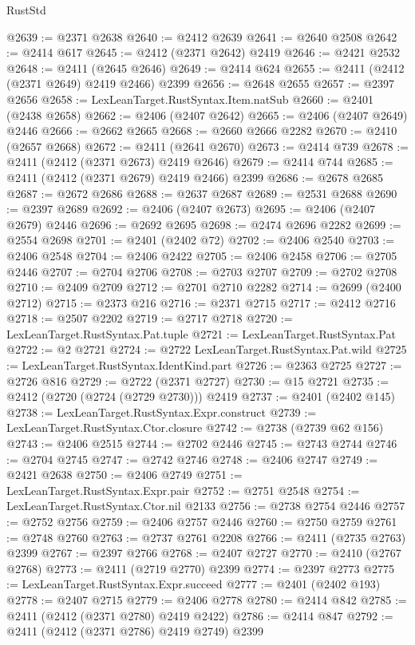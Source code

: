 \begin{lexlean}{RustStd}
\begin{coremodule}
@2639 := @2371 @2638
@2640 := @2412 @2639
@2641 := @2640 @2508
@2642 := @2414 @617
@2645 := @2412 (@2371 @2642) @2419
@2646 := @2421 @2532
@2648 := @2411 (@2645 @2646)
@2649 := @2414 @624
@2655 := @2411 (@2412 (@2371 @2649) @2419 @2466) @2399
@2656 := @2648 @2655
@2657 := @2397 @2656
@2658 := LexLeanTarget.RustSyntax.Item.natSub
@2660 := @2401 (@2438 @2658)
@2662 := @2406 (@2407 @2642)
@2665 := @2406 (@2407 @2649) @2446
@2666 := @2662 @2665
@2668 := @2660 @2666 @2282
@2670 := @2410 (@2657 @2668)
@2672 := @2411 (@2641 @2670)
@2673 := @2414 @739
@2678 := @2411 (@2412 (@2371 @2673) @2419 @2646)
@2679 := @2414 @744
@2685 := @2411 (@2412 (@2371 @2679) @2419 @2466) @2399
@2686 := @2678 @2685
@2687 := @2672 @2686
@2688 := @2637 @2687
@2689 := @2531 @2688
@2690 := @2397 @2689
@2692 := @2406 (@2407 @2673)
@2695 := @2406 (@2407 @2679) @2446
@2696 := @2692 @2695
@2698 := @2474 @2696 @2282
@2699 := @2554 @2698
@2701 := @2401 (@2402 @72)
@2702 := @2406 @2540
@2703 := @2406 @2548
@2704 := @2406 @2422
@2705 := @2406 @2458
@2706 := @2705 @2446
@2707 := @2704 @2706
@2708 := @2703 @2707
@2709 := @2702 @2708
@2710 := @2409 @2709
@2712 := @2701 @2710 @2282
@2714 := @2699 (@2400 @2712)
@2715 := @2373 @216
@2716 := @2371 @2715
@2717 := @2412 @2716
@2718 := @2507 @2202
@2719 := @2717 @2718
@2720 := LexLeanTarget.RustSyntax.Pat.tuple
@2721 := LexLeanTarget.RustSyntax.Pat
@2722 := @2 @2721
@2724 := @2722 LexLeanTarget.RustSyntax.Pat.wild
@2725 := LexLeanTarget.RustSyntax.IdentKind.part
@2726 := @2363 @2725
@2727 := @2726 @816
@2729 := @2722 (@2371 @2727)
@2730 := @15 @2721
@2735 := @2412 (@2720 (@2724 (@2729 @2730))) @2419
@2737 := @2401 (@2402 @145)
@2738 := LexLeanTarget.RustSyntax.Expr.construct
@2739 := LexLeanTarget.RustSyntax.Ctor.closure
@2742 := @2738 (@2739 @62 @156)
@2743 := @2406 @2515
@2744 := @2702 @2446
@2745 := @2743 @2744
@2746 := @2704 @2745
@2747 := @2742 @2746
@2748 := @2406 @2747
@2749 := @2421 @2638
@2750 := @2406 @2749
@2751 := LexLeanTarget.RustSyntax.Expr.pair
@2752 := @2751 @2548
@2754 := LexLeanTarget.RustSyntax.Ctor.nil @2133
@2756 := @2738 @2754 @2446
@2757 := @2752 @2756
@2759 := @2406 @2757 @2446
@2760 := @2750 @2759
@2761 := @2748 @2760
@2763 := @2737 @2761 @2208
@2766 := @2411 (@2735 @2763) @2399
@2767 := @2397 @2766
@2768 := @2407 @2727
@2770 := @2410 (@2767 @2768)
@2773 := @2411 (@2719 @2770) @2399
@2774 := @2397 @2773
@2775 := LexLeanTarget.RustSyntax.Expr.succeed
@2777 := @2401 (@2402 @193)
@2778 := @2407 @2715
@2779 := @2406 @2778
@2780 := @2414 @842
@2785 := @2411 (@2412 (@2371 @2780) @2419 @2422)
@2786 := @2414 @847
@2792 := @2411 (@2412 (@2371 @2786) @2419 @2749) @2399

\end{coremodule}
\end{lexlean}
